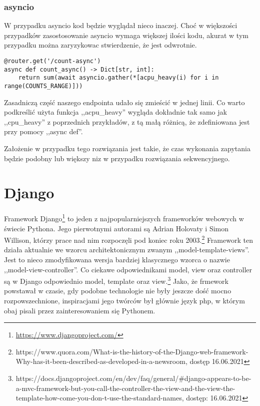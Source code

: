 \subsubsection{asyncio}
W przypadku asyncio kod będzie wyglądał nieco inaczej. Choć w większości przypadków zasostosowanie asyncio wymaga większej ilości kodu, akurat w tym przypadku można zaryzykowac stwierdzenie, że jest odwrotnie.
\begin{lstlisting}
@router.get('/count-async')
async def count_async() -> Dict[str, int]:
    return sum(await asyncio.gather(*[acpu_heavy(i) for i in range(COUNTS_RANGE)]))
\end{lstlisting}
Zasadniczą część naszego endpointa udało się zmieścić w jednej linii. Co warto podkreślić użyta funkcja ,,acpu\_heavy'' wygląda dokładnie tak samo jak ,,cpu\_heavy'' z poprzednich przykładów, z tą małą różnicą, że zdefiniowana jest przy pomocy ,,async def''.

Założenie w przypadku tego rozwiązania jest takie, że czas wykonania zapytania będzie podobny lub większy niz w przypadku rozwiązania sekwencyjnego.


\section{Django}
Framework Django\footnote{\url{https://www.djangoproject.com/}} to jeden z najpopularniejszych frameworków webowych w świecie Pythona. Jego pierwotnymi autorami są Adrian Holovaty i Simon Willison, którzy prace nad nim rozpoczęli pod koniec roku 2003.\footnote{https://www.quora.com/What-is-the-history-of-the-Django-web-framework-Why-has-it-been-described-as-developed-in-a-newsroom, dostęp 16.06.2021} Framework ten działa aktualnie we wzorcu architektonicznym zwanym ,,model-template-views''. Jest to nieco zmodyfikowana wersja bardziej klasycznego wzorca o nazwie ,,model-view-controller''. Co ciekawe odpowiednikami model, view oraz controller są w Django odpowiednio model, template oraz view.\footnote{https://docs.djangoproject.com/en/dev/faq/general/\#django-appears-to-be-a-mvc-framework-but-you-call-the-controller-the-view-and-the-view-the-template-how-come-you-don-t-use-the-standard-names, dostęp: 16.06.2021} Jako, że frmework powstawał w czasie, gdy podobne technologie nie były jeszcze dość mocno rozpowszechnione, inspiracjami jego twórców był głównie język php, w którym obaj pisali przez zainteresowaniem się Pythonem.

